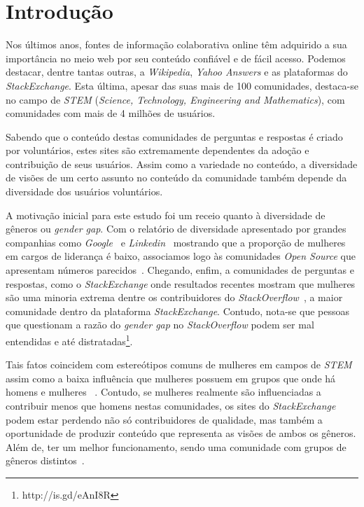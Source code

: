\chapter{Introdução}
\label{sec:introduction}

Nos últimos anos, fontes de informação colaborativa online têm adquirido a sua importância no meio web por seu conteúdo confiável e de fácil acesso. Podemos destacar, dentre tantas outras, a \emph{Wikipedia}, \emph{Yahoo Answers} e as plataformas do \emph{StackExchange}. Esta última, apesar das suas mais de 100 comunidades, destaca-se no campo de \emph{STEM} (\emph{Science, Technology, Engineering and Mathematics}), com comunidades com mais de 4 milhões de usuários. 

Sabendo que o conteúdo destas comunidades de perguntas e respostas é criado por voluntários, estes sites são extremamente dependentes da adoção e contribuição de seus usuários. Assim como a variedade no conteúdo, a diversidade de visões de um certo assunto no conteúdo da comunidade também depende da diversidade dos usuários voluntários.

A motivação inicial para este estudo foi um receio quanto à diversidade de gêneros ou \emph{gender gap}. Com o relatório de diversidade apresentado por grandes companhias como \emph{Google}~\cite{google:report} e \emph{Linkedin}~\cite{linkedin:report} mostrando que a proporção de mulheres em cargos de liderança é baixo, associamos logo às comunidades \emph{Open Source} que apresentam números parecidos~\cite{rustad2011suck}. Chegando, enfim, a comunidades de perguntas e respostas, como o \emph{StackExchange} onde resultados recentes mostram que mulheres são uma minoria extrema dentre os contribuidores do \emph{StackOverflow}~\cite{Vasilescu27092013}, a maior comunidade dentro da plataforma \emph{StackExchange}. Contudo, nota-se que pessoas que questionam a razão do \emph{gender gap} no \emph{StackOverflow} podem ser mal entendidas e até distratadas\footnote{http://is.gd/eAnI8R}.

Tais fatos coincidem com estereótipos comuns de mulheres em campos de \emph{STEM}~\cite{spencer1999stereotype} assim como a baixa influência que mulheres possuem em grupos que onde há homens e mulheres ~\cite{karpowitz2012gender}. Contudo, se mulheres realmente são influenciadas a contribuir menos que homens nestas comunidades, os sites do \emph{StackExchange} podem estar perdendo não só contribuidores de qualidade, mas também a oportunidade de produzir conteúdo que representa as visões de ambos os gêneros. Além de, ter um melhor funcionamento, sendo uma comunidade com grupos de gêneros distintos~\cite{marshall1975boys}.

